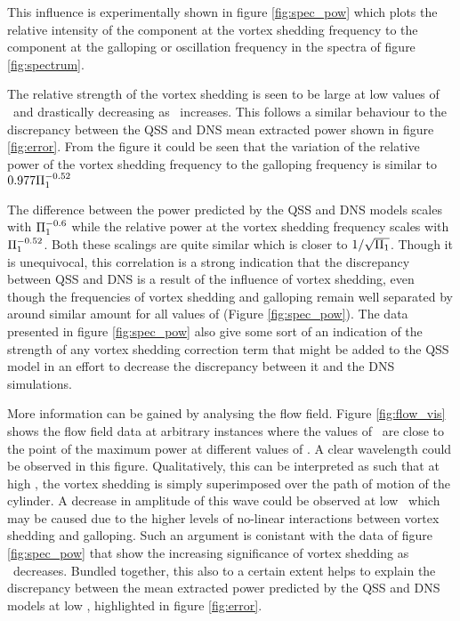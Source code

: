 This influence is experimentally shown in figure \ref{fig:spec_pow} which plots the relative intensity of the component at the vortex shedding frequency to the component at the galloping or oscillation frequency in the spectra of figure \ref{fig:spectrum}.



The relative strength of the vortex shedding is seen to be large at low values of \massstiff\ and drastically decreasing as \massstiff\ increases. This follows a similar behaviour to the discrepancy between the QSS and DNS mean extracted power shown in figure \ref{fig:error}. From the figure it could be seen that the variation of the relative power of the vortex shedding frequency to the galloping frequency is similar to  $0.977\Pi_1^{-0.52}$ 

The difference between the power predicted by the QSS and DNS models scales with $\Pi_1^{-0.6}$ while the relative power at the vortex shedding frequency scales with $\Pi_1^{-0.52}$. Both these scalings are quite similar which is closer to $1/\sqrt{\Pi_1}$. Though it is unequivocal, this correlation is a strong indication that the discrepancy between QSS and DNS is a result of the influence of vortex shedding, even though the frequencies of vortex shedding and galloping remain well separated by around similar amount for all values of \massstiff (Figure \ref{fig:spec_pow}). The data presented in figure \ref{fig:spec_pow} also give some sort of an indication of the strength of any vortex shedding correction term that might be added to the QSS model in an effort to decrease the discrepancy between it and the DNS simulations.





More information can be gained by analysing the flow field. Figure \ref{fig:flow_vis} shows the flow field data at arbitrary instances where the values of \massdamp\ are close to the point of the maximum power at different values of \massstiff. A clear wavelength could be observed in this figure. Qualitatively, this can be interpreted as such that at high \massstiff, the vortex shedding is simply superimposed over the path of motion of the cylinder. A decrease in amplitude of this wave could be observed at low \massstiff\ which may be caused due to the higher levels of no-linear interactions between vortex shedding and galloping. Such an argument is conistant with the data of figure \ref{fig:spec_pow} that show the increasing significance of vortex shedding as \massstiff\ decreases. Bundled together, this also to a certain extent helps to explain the discrepancy between the mean extracted power predicted by the QSS and DNS models at low \massstiff, highlighted in figure \ref{fig:error}.



